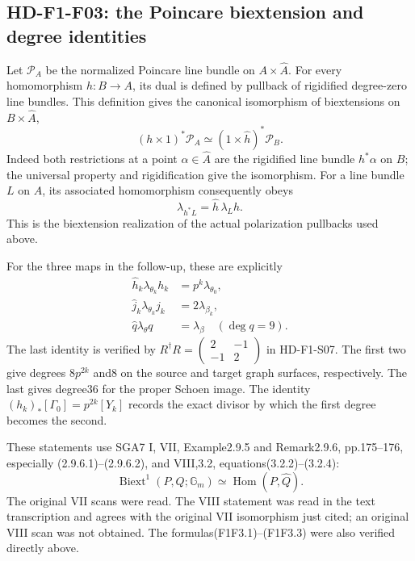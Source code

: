 \subsection{HD-F1-F03: the Poincare biextension and degree identities}

Let $\mathcal P_A$ be the normalized Poincare line bundle on
$A\times\widehat A$. For every homomorphism $h:B\to A$, its
dual is defined by pullback of rigidified degree-zero line bundles.
This definition gives the canonical isomorphism of biextensions
on $B\times\widehat A$,
\[
 (h\times1)^*\mathcal P_A
       \simeq(1\times\widehat h)^*\mathcal P_B.
 \tag{F1F3.1}
\]
Indeed both restrictions at a point $\alpha\in\widehat A$ are
the rigidified line bundle $h^*\alpha$ on $B$; the universal
property and rigidification give the isomorphism. For a line
bundle $L$ on $A$, its associated homomorphism consequently obeys
\[
 \lambda_{h^*L}=\widehat h\,\lambda_Lh.
 \tag{F1F3.2}
\]
This is the biextension realization of the actual polarization
pullbacks used above.

For the three maps in the follow-up, these are explicitly
\[
 \begin{split}
 \widehat h_k\lambda_{\theta_k}h_k&=p^k\lambda_{\theta_0},\\
 \widehat j_k\lambda_{\theta_k}j_k&=2\lambda_{\beta_k},\\
 \widehat q\lambda_\theta q&=\lambda_\beta
       \quad(\deg q=9).
 \end{split}
 \tag{F1F3.3}
\]
The last identity is verified by $R^\dagger R=
\left(\begin{smallmatrix}2&-1\\-1&2\end{smallmatrix}\right)$
in HD-F1-S07. The first two give degrees $8p^{2k}$ and8 on
the source and target graph surfaces, respectively. The last
gives degree36 for the proper Schoen image. The identity
$(h_k)_*[\Gamma_0]=p^{2k}[Y_k]$ records the exact divisor by
which the first degree becomes the second.

These statements use SGA7 I, VII, Example2.9.5 and
Remark2.9.6, pp.175--176, especially (2.9.6.1)--(2.9.6.2),
and VIII,3.2, equations(3.2.2)--(3.2.4):
\[
 \operatorname{Biext}^1(P,Q;\mathbb G_m)
       \simeq\operatorname{Hom}(P,\widehat Q).
 \tag{F1F3.4}
\]
The original VII scans were read. The VIII statement was read
in the text transcription and agrees with the original VII
isomorphism just cited; an original VIII scan was not obtained.
The formulas(F1F3.1)--(F1F3.3) were also verified directly above.

